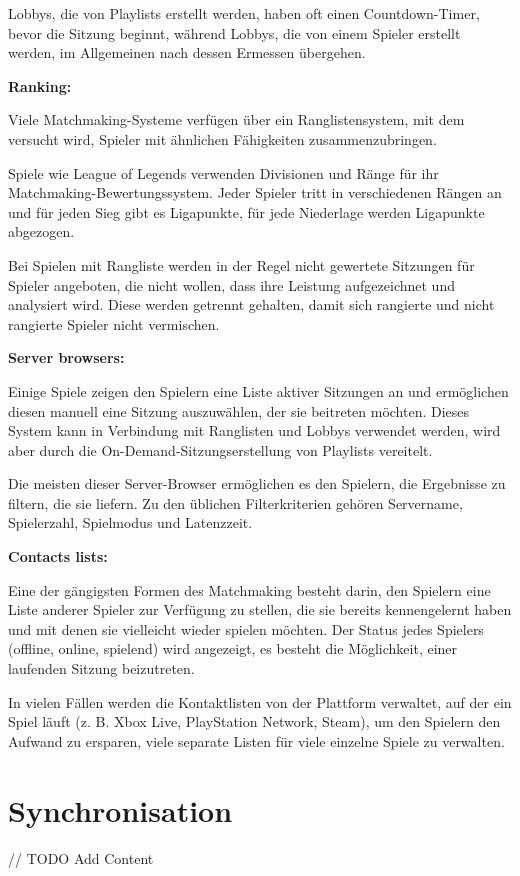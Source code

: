 Lobbys, die von Playlists erstellt werden, haben oft einen Countdown-Timer, bevor die Sitzung beginnt, während Lobbys, die von einem Spieler erstellt werden, im Allgemeinen nach dessen Ermessen übergehen.

\cite{Wikipedia.2021b}

\textbf{Ranking:}

Viele Matchmaking-Systeme verfügen über ein Ranglistensystem, mit dem versucht wird, Spieler mit ähnlichen Fähigkeiten zusammenzubringen.

Spiele wie League of Legends verwenden Divisionen und Ränge für ihr Matchmaking-Bewertungssystem. Jeder Spieler tritt in verschiedenen Rängen an und für jeden Sieg gibt es Ligapunkte, für jede Niederlage werden Ligapunkte abgezogen.

Bei Spielen mit Rangliste werden in der Regel nicht gewertete Sitzungen für Spieler angeboten, die nicht wollen, dass ihre Leistung aufgezeichnet und analysiert wird. Diese werden getrennt gehalten, damit sich rangierte und nicht rangierte Spieler nicht vermischen.

\cite{Wikipedia.2021b}

\textbf{Server browsers:}

Einige Spiele zeigen den Spielern eine Liste aktiver Sitzungen an und ermöglichen diesen manuell eine Sitzung auszuwählen, der sie beitreten möchten. Dieses System kann in Verbindung mit Ranglisten und Lobbys verwendet werden, wird aber durch die On-Demand-Sitzungserstellung von Playlists vereitelt.

Die meisten dieser Server-Browser ermöglichen es den Spielern, die Ergebnisse zu filtern, die sie liefern. Zu den üblichen Filterkriterien gehören Servername, Spielerzahl, Spielmodus und Latenzzeit. 

\cite{Wikipedia.2021b}

\textbf{Contacts lists:}

Eine der gängigsten Formen des Matchmaking besteht darin, den Spielern eine Liste anderer Spieler zur Verfügung zu stellen, die sie bereits kennengelernt haben und mit denen sie vielleicht wieder spielen möchten. Der Status jedes Spielers (offline, online, spielend) wird angezeigt, es besteht die Möglichkeit, einer laufenden Sitzung beizutreten.

In vielen Fällen werden die Kontaktlisten von der Plattform verwaltet, auf der ein Spiel läuft (z. B. Xbox Live, PlayStation Network, Steam), um den Spielern den Aufwand zu ersparen, viele separate Listen für viele einzelne Spiele zu verwalten. 

\cite{Wikipedia.2021b}

\section{Synchronisation}

// TODO Add Content